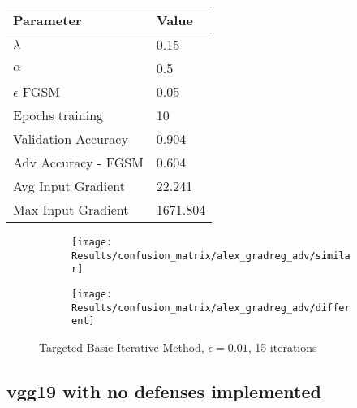 \documentclass[draft,final]{vutinfth} %
\begin{document}
\begin{table}[h]
  \centering
  \begin{tabular}{ll}
    \toprule
			Parameter			& Value   \\
    \midrule
			$\lambda$								& 0.15		\\
			$\alpha$								& 0.5			\\
			$\epsilon$ FGSM					& 0.05		\\
			Epochs training					& 10			\\
			
			Validation Accuracy			& 0.904		\\
			Adv Accuracy - FGSM			& 0.604		\\
			
			Avg Input Gradient			& 22.241	\\
			Max Input Gradient			& 1671.804\\
    \bottomrule
  \end{tabular}
\end{table}

\begin{figure}[h]
  \begin{subfigure}[b]{0.5\columnwidth}
		\centering
    \texttt{[image: Results/confusion\_matrix/alex\_gradreg\_adv/similar]}
    \label{fig:exp:cm:alex_gradreg_adv:similar}
  \end{subfigure}
  \begin{subfigure}[b]{0.5\columnwidth}
		\centering
    \texttt{[image: Results/confusion\_matrix/alex\_gradreg\_adv/different]}
    \label{fig:exp:cm:alex_gradreg_adv:different}
  \end{subfigure}
  \caption{Targeted Basic Iterative Method, $\epsilon = 0.01$, 15 iterations}
\end{figure}
\clearpage



\subsection{vgg19 with no defenses implemented}
\end{document}
